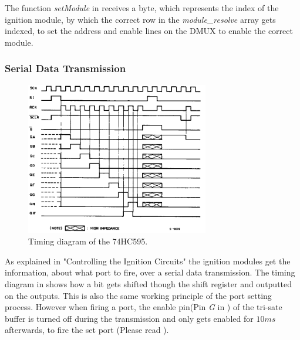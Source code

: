 \noindent The function \textit{setModule} in  receives a byte, which represents the index of the ignition module, by which  the correct row in the \textit{module\_resolve} array gets indexed, to set the address and enable lines on the DMUX to enable the correct module.\\

\pagebreak

\subsubsection{Serial Data Transmission}
\label{Serial Data Transmission}
\begin{figure}[!ht]
    \centering
    \includegraphics[width=8cm]{./Figures/75hc595_timing.png}
    \caption{Timing diagram of the 74HC595.}
    \label{fig:74hc595_timing}     
\end{figure}


\noindent As explained in  "Controlling the Ignition Circuits" the ignition modules get the information, about what port to fire, over a serial data transmission. The timing diagram in  shows how a bit gets shifted though the shift register and outputted on the outputs. This is also the same working principle of the port setting process. However when firing a port, the enable pin(Pin \textit{G} in ) of the tri-sate buffer is turned off during the transmission  and only gets enabled for $10ms$ afterwards, to fire the set port (Please read ).\\




